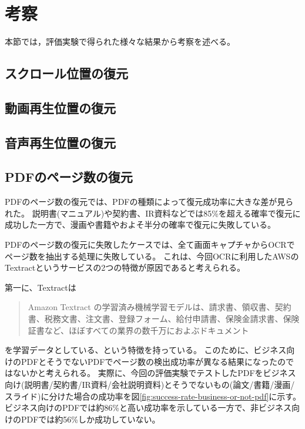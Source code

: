 \section{考察}
本節では，評価実験で得られた様々な結果から考察を述べる。

\subsection{スクロール位置の復元}



\subsection{動画再生位置の復元}

\subsection{音声再生位置の復元}

\subsection{PDFのページ数の復元}

PDFのページ数の復元では、PDFの種類によって復元成功率に大きな差が見られた。
説明書(マニュアル)や契約書、IR資料などでは85\%を超える確率で復元に成功した一方で、漫画や書籍やおよそ半分の確率で復元に失敗している。

PDFのページ数の復元に失敗したケースでは、全て画面キャプチャからOCRでページ数を抽出する処理に失敗している。
これは、今回OCRに利用したAWSのTextractというサービスの2つの特徴が原因であると考えられる。

第一に、Textractは
\begin{quote}
Amazon Textract の学習済み機械学習モデルは、請求書、領収書、契約書、税務文書、注文書、登録フォーム、給付申請書、保険金請求書、保険証書など、ほぼすべての業界の数千万におよぶドキュメント
\end{quote}
を学習データとしている、という特徴を持っている\cite{}。
このために、ビジネス向けのPDFとそうでないPDFでページ数の検出成功率が異なる結果になったのではないかと考えられる。
実際に、今回の評価実験でテストしたPDFをビジネス向け(説明書/契約書/IR資料/会社説明資料)とそうでないもの(論文/書籍/漫画/スライド)に分けた場合の成功率を図\ref{fig:success-rate-business-or-not-pdf}に示す。
ビジネス向けのPDFでは約86\%と高い成功率を示している一方で、非ビジネス向けのPDFでは約56\%しか成功していない。


